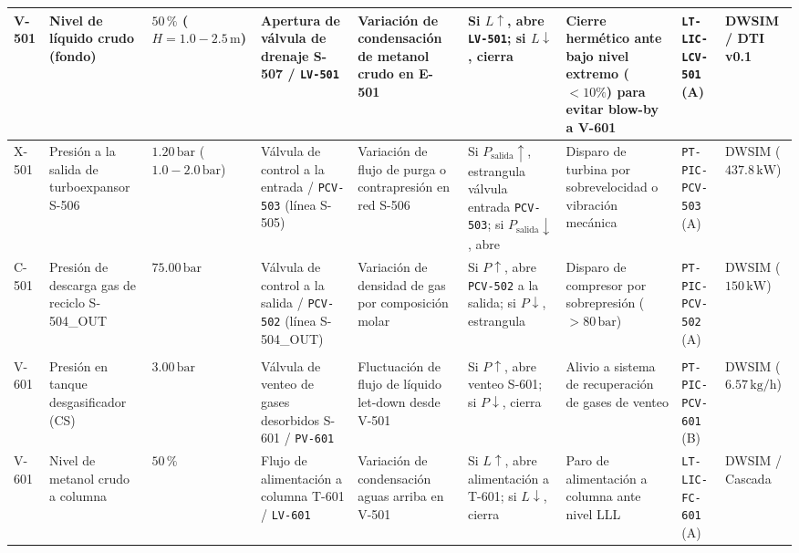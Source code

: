 \documentclass[10pt,letterpaper]{article}
\begin{document}
\begin{landscape}
\begin{longtable}{|p{1.4cm}|p{2.3cm}|p{2.0cm}|p{2.9cm}|p{2.8cm}|p{3.0cm}|p{3.4cm}|p{2.5cm}|p{1.5cm}|}
V-501 & Nivel de líquido crudo (fondo) & $50\,\%$ ($H = 1.0 - 2.5\,\text{m}$) & Apertura de válvula de drenaje S-507 / \texttt{LV-501} & Variación de condensación de metanol crudo en E-501 & Si $L \uparrow$, abre \texttt{LV-501}; si $L \downarrow$, cierra & Cierre hermético ante bajo nivel extremo ($<10\%$) para evitar blow-by a V-601 & \texttt{LT-LIC-LCV-501} (A) & DWSIM / DTI v0.1 \\ \hline

X-501 & Presión a la salida de turboexpansor S-506 & $1.20\,\text{bar}$ ($1.0 - 2.0\,\text{bar}$) & Válvula de control a la entrada / \texttt{PCV-503} (línea S-505) & Variación de flujo de purga o contrapresión en red S-506 & Si $P_{\text{salida}} \uparrow$, estrangula válvula entrada \texttt{PCV-503}; si $P_{\text{salida}} \downarrow$, abre & Disparo de turbina por sobrevelocidad o vibración mecánica & \texttt{PT-PIC-PCV-503} (A) & DWSIM ($437.8\,\text{kW}$) \\ \hline

C-501 & Presión de descarga gas de reciclo S-504\_OUT & $75.00\,\text{bar}$ & Válvula de control a la salida / \texttt{PCV-502} (línea S-504\_OUT) & Variación de densidad de gas por composición molar & Si $P \uparrow$, abre \texttt{PCV-502} a la salida; si $P \downarrow$, estrangula & Disparo de compresor por sobrepresión ($>80\,\text{bar}$) & \texttt{PT-PIC-PCV-502} (A) & DWSIM ($150\,\text{kW}$) \\ \hline

\rowcolor{tablerowalt}\multicolumn{9}{|l|}{\textbf{\color{navyblue}Área 600: Desgasificación LP y Destilación Fraccionada de Metanol}} \\ \hline

V-601 & Presión en tanque desgasificador (CS) & $3.00\,\text{bar}$ & Válvula de venteo de gases desorbidos S-601 / \texttt{PV-601} & Fluctuación de flujo de líquido let-down desde V-501 & Si $P \uparrow$, abre venteo S-601; si $P \downarrow$, cierra & Alivio a sistema de recuperación de gases de venteo & \texttt{PT-PIC-PCV-601} (B) & DWSIM ($6.57\,\text{kg/h}$) \\ \hline

V-601 & Nivel de metanol crudo a columna & $50\,\%$ & Flujo de alimentación a columna T-601 / \texttt{LV-601} & Variación de condensación aguas arriba en V-501 & Si $L \uparrow$, abre alimentación a T-601; si $L \downarrow$, cierra & Paro de alimentación a columna ante nivel LLL & \texttt{LT-LIC-FC-601} (A) & DWSIM / Cascada \\ \hline


\end{longtable}
\end{landscape}
\end{document}
